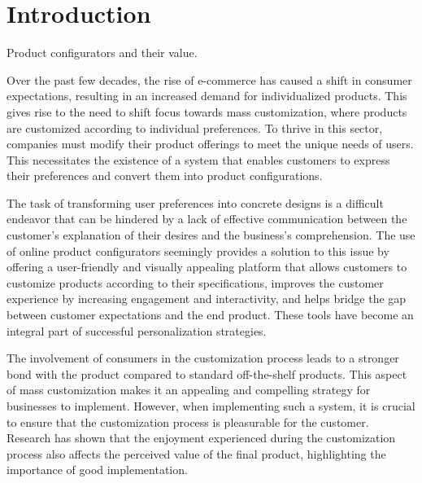 \chapter*{Introduction}
\setcounter{page}{1}

\begin{chapterabstract}
Product configurators and their value.
\end{chapterabstract}

Over the past few decades, the rise of e-commerce has caused a shift in consumer expectations, resulting in an increased demand for individualized products. This gives rise to the need to shift focus towards mass customization, where products are customized according to individual preferences. To thrive in this sector, companies must modify their product offerings to meet the unique needs of users. This necessitates the existence of a system that enables customers to express their preferences and convert them into product configurations. \cite{Fulkerson2000}

The task of transforming user preferences into concrete designs is a difficult endeavor that can be hindered by a lack of effective communication between the customer's explanation of their desires and the business's comprehension. The use of online product configurators seemingly provides a solution to this issue by offering a user-friendly and visually appealing platform that allows customers to customize products according to their specifications, improves the customer experience by increasing engagement and interactivity, and helps bridge the gap between customer expectations and the end product. These tools have become an integral part of successful personalization strategies. \cite{Franke2003}

The involvement of consumers in the customization process leads to a stronger bond with the product compared to standard off-the-shelf products. This aspect of mass customization makes it an appealing and compelling strategy for businesses to implement. \cite{Schreier2006} However, when implementing such a system, it is crucial to ensure that the customization process is pleasurable for the customer. Research has shown that the enjoyment experienced during the customization process also affects the perceived value of the final product, highlighting the importance of good implementation. \cite{Franke2010}

